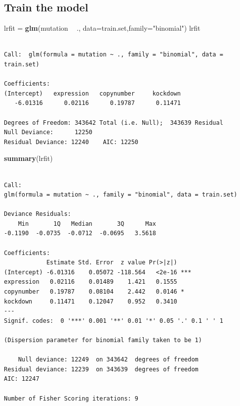\documentclass[]{article}
\newenvironment{Shaded}{\begin{snugshade}}{\end{snugshade}}
\newcommand{\KeywordTok}[1]{\textcolor[rgb]{0.13,0.29,0.53}{\textbf{#1}}}
\newcommand{\DataTypeTok}[1]{\textcolor[rgb]{0.13,0.29,0.53}{#1}}
\newcommand{\StringTok}[1]{\textcolor[rgb]{0.31,0.60,0.02}{#1}}
\newcommand{\OperatorTok}[1]{\textcolor[rgb]{0.81,0.36,0.00}{\textbf{#1}}}
\newcommand{\NormalTok}[1]{#1}
\begin{document}
\subsection{Train the model}\label{train-the-model}

\begin{Shaded}
\begin{Highlighting}[]
\NormalTok{lrfit =}\StringTok{ }\KeywordTok{glm}\NormalTok{(mutation }\OperatorTok{~}\StringTok{ }\NormalTok{., }\DataTypeTok{data=}\NormalTok{train.set,}\DataTypeTok{family=}\StringTok{"binomial"}\NormalTok{) }
\NormalTok{lrfit}
\end{Highlighting}
\end{Shaded}

\begin{verbatim}

Call:  glm(formula = mutation ~ ., family = "binomial", data = train.set)

Coefficients:
(Intercept)   expression   copynumber     kockdown  
   -6.01316      0.02116      0.19787      0.11471  

Degrees of Freedom: 343642 Total (i.e. Null);  343639 Residual
Null Deviance:      12250 
Residual Deviance: 12240    AIC: 12250
\end{verbatim}

\begin{Shaded}
\begin{Highlighting}[]
\KeywordTok{summary}\NormalTok{(lrfit)}
\end{Highlighting}
\end{Shaded}

\begin{verbatim}

Call:
glm(formula = mutation ~ ., family = "binomial", data = train.set)

Deviance Residuals: 
    Min       1Q   Median       3Q      Max  
-0.1190  -0.0735  -0.0712  -0.0695   3.5618  

Coefficients:
            Estimate Std. Error  z value Pr(>|z|)    
(Intercept) -6.01316    0.05072 -118.564   <2e-16 ***
expression   0.02116    0.01489    1.421   0.1555    
copynumber   0.19787    0.08104    2.442   0.0146 *  
kockdown     0.11471    0.12047    0.952   0.3410    
---
Signif. codes:  0 '***' 0.001 '**' 0.01 '*' 0.05 '.' 0.1 ' ' 1

(Dispersion parameter for binomial family taken to be 1)

    Null deviance: 12249  on 343642  degrees of freedom
Residual deviance: 12239  on 343639  degrees of freedom
AIC: 12247

Number of Fisher Scoring iterations: 9
\end{verbatim}
\end{document}
